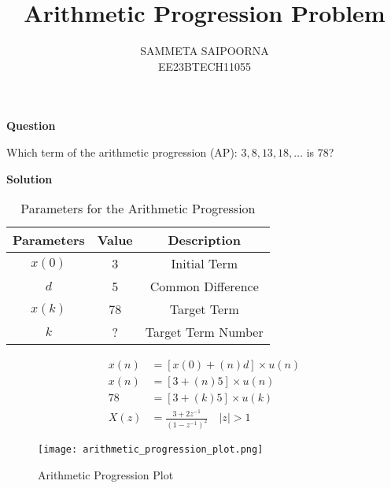 \documentclass[12pt]{article}
\title{Arithmetic Progression Problem}
\author{SAMMETA SAIPOORNA \\
        EE23BTECH11055}
\date{}
\newcommand{\initialterm}{3}
\newcommand{\commondifference}{5}
\begin{document}
\maketitle

\textbf{Question}

Which term of the arithmetic progression (AP): \(3, 8, 13, 18, \ldots\) is \(78\)?

\textbf{Solution}
\begin{table}[h!]
\centering

\begin{tabular}{|c|c|c|}
  \hline
  Parameters & Value & Description \\
  \hline
  \(x(0)\) & 3 & Initial Term \\
  \hline
  \(d\) & 5 & Common Difference \\
  \hline
  \(x(k)\) & 78 & Target Term \\
  \hline
  \(k\) & ? & Target Term Number\\
  \hline
\end{tabular}
\caption{Parameters for the Arithmetic Progression}
\label{tab:ap-parameters}
\end{table}
\begin{align}
x(n) &= [x(0) + (n)d] \times u(n) \\
x(n) &= [\initialterm + (n)\commondifference] \times u(n) \\
78 &= [\initialterm + (k)\commondifference] \times u(k) \\
X(z) &= \frac{3 + 2z^{-1}}{(1 - z^{-1})^2} \quad |z| > 1
\end{align}
\begin{figure}[h!]
  \centering
  \texttt{[image: arithmetic\_progression\_plot.png]}
  \caption{Arithmetic Progression Plot}
  \label{fig:ap-plot}
\end{figure}
\end{document}
